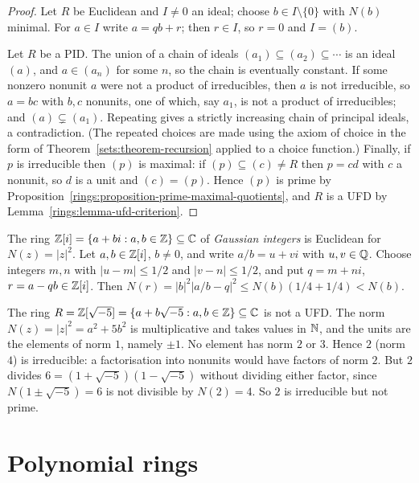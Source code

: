 \begin{proof}
Let $R$ be Euclidean and $I \neq 0$ an ideal; choose $b \in I \setminus \{0\}$ with $N(b)$
minimal. For $a \in I$ write $a = qb + r$; then $r \in I$, so $r = 0$ and $I = (b)$.

Let $R$ be a PID. The union of a chain of ideals $(a_1) \subseteq (a_2) \subseteq \cdots$ is
an ideal $(a)$, and $a \in (a_n)$ for some $n$, so the chain is eventually constant.
If some nonzero nonunit $a$ were not a product of irreducibles, then $a$ is not
irreducible, so $a = bc$ with $b, c$ nonunits, one of which, say $a_1$, is not a
product of irreducibles; and $(a) \subsetneq (a_1)$. Repeating gives a strictly increasing
chain of principal ideals, a contradiction. (The repeated choices are made using
the axiom of choice in the form of Theorem~\ref{sets:theorem-recursion} applied to a
choice function.) Finally, if $p$ is irreducible then $(p)$ is maximal: if
$(p) \subseteq (c) \neq R$ then $p = cd$ with $c$ a nonunit, so $d$ is a unit and
$(c) = (p)$. Hence $(p)$ is prime by
Proposition~\ref{rings:proposition-prime-maximal-quotients}, and $R$ is a UFD by
Lemma~\ref{rings:lemma-ufd-criterion}.
\end{proof}

\begin{example}\label{rings:example-gaussian-integers}
The ring $\mathbb{Z}[i] = \{a + bi : a, b \in \mathbb{Z}\} \subseteq \mathbb{C}$ of \emph{Gaussian integers} is
Euclidean for $N(z) = |z|^2$. Let $a, b \in \mathbb{Z}[i]$, $b \neq 0$, and write
$a/b = u + vi$ with $u, v \in \mathbb{Q}$. Choose integers $m, n$ with $|u - m| \leq 1/2$ and
$|v - n| \leq 1/2$, and put $q = m + ni$, $r = a - qb \in \mathbb{Z}[i]$. Then
$N(r) = |b|^2 |a/b - q|^2 \leq N(b)(1/4 + 1/4) < N(b)$.
\end{example}

\begin{counterexample}\label{rings:counterexample-not-ufd}
The ring $R = \mathbb{Z}[\sqrt{-5}] = \{a + b\sqrt{-5} : a, b \in \mathbb{Z}\} \subseteq \mathbb{C}$ is not a UFD. The
norm $N(z) = |z|^2 = a^2 + 5b^2$ is multiplicative and takes values in $\mathbb{N}$, and the
units are the elements of norm $1$, namely $\pm 1$. No element has norm $2$ or $3$. Hence
$2$ (norm $4$) is irreducible: a factorisation into nonunits would have factors of
norm $2$. But $2$ divides $6 = (1 + \sqrt{-5})(1 - \sqrt{-5})$ without dividing either factor,
since $N(1 \pm \sqrt{-5}) = 6$ is not divisible by $N(2) = 4$. So $2$ is irreducible but not
prime.
\end{counterexample}

\section{Polynomial rings}\label{rings:section-polynomials}

